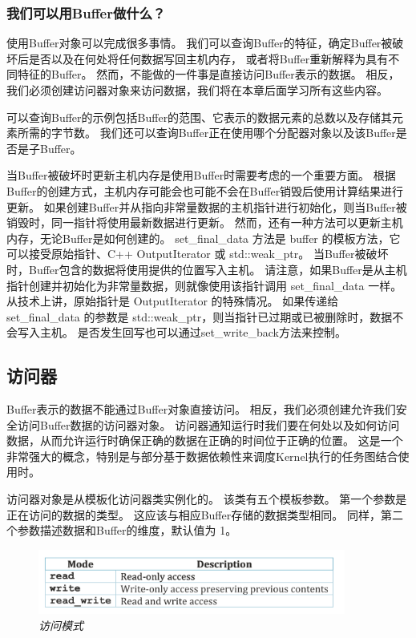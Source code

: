\subsubsection{我们可以用Buffer做什么？}
使用Buffer对象可以完成很多事情。 我们可以查询Buffer的特征，确定Buffer被破坏后是否以及在何处将任何数据写回主机内存，
或者将Buffer重新解释为具有不同特征的Buffer。 然而，不能做的一件事是直接访问Buffer表示的数据。 
相反，我们必须创建访问器对象来访问数据，我们将在本章后面学习所有这些内容。

可以查询Buffer的示例包括Buffer的范围、它表示的数据元素的总数以及存储其元素所需的字节数。 
我们还可以查询Buffer正在使用哪个分配器对象以及该Buffer是否是子Buffer。

当Buffer被破坏时更新主机内存是使用Buffer时需要考虑的一个重要方面。 
根据Buffer的创建方式，主机内存可能会也可能不会在Buffer销毁后使用计算结果进行更新。 
如果创建Buffer并从指向非常量数据的主机指针进行初始化，则当Buffer被销毁时，同一指针将使用最新数据进行更新。 
然而，还有一种方法可以更新主机内存，无论Buffer是如何创建的。 
set\_final\_data 方法是 buffer 的模板方法，它可以接受原始指针、C++ OutputIterator 或 std::weak\_ptr。 
当Buffer被破坏时，Buffer包含的数据将使用提供的位置写入主机。 
请注意，如果Buffer是从主机指针创建并初始化为非常量数据，则就像使用该指针调用 set\_final\_data 一样。 
从技术上讲，原始指针是 OutputIterator 的特殊情况。 
如果传递给 set\_final\_data 的参数是 std::weak\_ptr，则当指针已过期或已被删除时，数据不会写入主机。 
是否发生回写也可以通过set\_write\_back方法来控制。

\subsection{访问器}
Buffer表示的数据不能通过Buffer对象直接访问。 相反，我们必须创建允许我们安全访问Buffer数据的访问器对象。 
访问器通知运行时我们要在何处以及如何访问数据，从而允许运行时确保正确的数据在正确的时间位于正确的位置。 
这是一个非常强大的概念，特别是与部分基于数据依赖性来调度Kernel执行的任务图结合使用时。

访问器对象是从模板化访问器类实例化的。 该类有五个模板参数。 第一个参数是正在访问的数据的类型。 
这应该与相应Buffer存储的数据类型相同。 同样，第二个参数描述数据和Buffer的维度，默认值为 1。

\begin{figure}[H]
	\centering
	\includegraphics[width=0.9\textwidth]{figs/F7.6.png}
	\caption{\textit{访问模式 }}
\end{figure}

